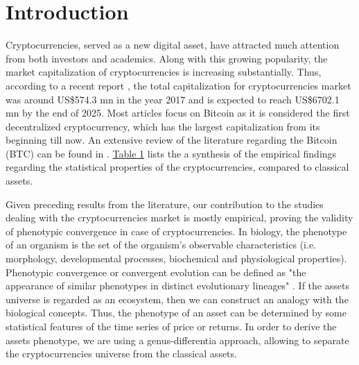 \section*{Introduction}

Cryptocurrencies, served as a new digital asset, have attracted much attention from both investors and academics. Along with this growing popularity, the market capitalization of cryptocurrencies is increasing substantially. Thus, according to a recent report \citep{TransparencyMarketResearch.2018}, the total capitalization for cryptocurrencies market was around US\$574.3 mn in the year 2017 and is expected to reach US\$6702.1 mn by the end of 2025. Most articles focus on Bitcoin as it is considered the first decentralized cryptocurrency, which has the largest capitalization from its beginning till now. An extensive review of the literature regarding the Bitcoin (BTC) can be found in \cite{Corbet.2018}. \hyperref[table:intro_sources]{Table 1} lists the a synthesis of the empirical findings regarding the statistical properties of the cryptocurrencies, compared to classical assets.
 
Given preceding results from the literature, our contribution to the studies dealing with the cryptocurrencies market is mostly empirical, proving the validity of phenotypic convergence in case of cryptocurrencies. In biology, the phenotype of an organism \citep{Mahner.1997} is the set of the organism's observable characteristics (i.e. morphology, developmental processes, biochemical and physiological properties). Phenotypic convergence or convergent evolution can be defined as "the appearance of similar phenotypes in distinct evolutionary lineages" \citep{Washburn.2016}. If the assets universe is regarded as an ecosystem, then we can construct an analogy with the biological concepts. Thus, the phenotype of an asset can be determined by some statistical features of the time series of price or returns. In order to derive the assets phenotype, we are using a genus-differentia approach, allowing to separate the cryptocurrencies universe from the classical assets.

